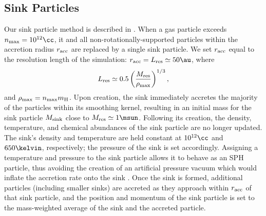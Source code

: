 \subsection{Sink Particles}
\label{sinkParticles}
Our sink particle method is described in \citet{StacyGreifBromm2010}. When a gas particle exceeds $n_{\rm max} = 10^{12}\cc$, it and all non-rotationally-supported particles within the accretion radius $r_{\rm acc}$ are replaced by a single sink particle.  We set $r_{\rm acc}$ equal to the resolution length of the simulation: $r_{\rm acc} = L_{\rm res} \simeq 50\au$, where 
\begin{equation}
L_{\rm res} \simeq 0.5 \left( \frac{M_{\rm res}}{\rho_{\rm max}} \right)^{1/3},
\end{equation}
and $\rho_{\rm max} = n_{\rm max} m_{\rm H}$.  Upon creation, the sink immediately accretes the majority of the particles within its smoothing kernel, resulting in an initial mass for the sink particle $M_{\rm sink}$ close to $M_{\rm res} \simeq 1\msun$.  Following its creation, the density, temperature, and chemical abundances of the sink particle are no longer updated.  The sink's density and temperature are held constant at $10^{12}\cc$ and $650\kelvin$, respectively; the pressure of the sink is set accordingly. Assigning a temperature and pressure to the sink particle allows it to behave as an SPH particle, thus avoiding the creation of an artificial pressure vacuum which would inflate the accretion rate onto the sink \citep[see][]{BrommCoppiLarson2002, MartelEvansShapiro2006}. Once the sink is formed, additional particles (including smaller sinks) are accreted as they approach within $r_{\rm acc}$ of that sink particle, and the position and momentum of the sink particle is set to the mass-weighted average of the sink and the accreted particle.